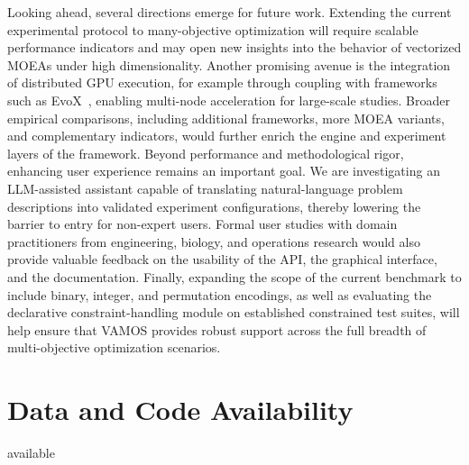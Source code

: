 \documentclass[final,5p,times,twocolumn]{elsarticle}
\newcommand{\VAMOS}{VAMOS}
\begin{document}
Looking ahead, several directions emerge for future work. Extending the current experimental protocol to many-objective optimization will require scalable performance indicators and may open new insights into the behavior of vectorized MOEAs under high dimensionality. Another promising avenue is the integration of distributed GPU execution, for example through coupling with frameworks such as EvoX~\cite{HCL+25}, enabling multi-node acceleration for large-scale studies. Broader empirical comparisons, including additional frameworks, more MOEA variants, and complementary indicators, would further enrich the engine and experiment layers of the framework. Beyond performance and methodological rigor, enhancing user experience remains an important goal. We are investigating an LLM-assisted assistant capable of translating natural-language problem descriptions into validated experiment configurations, thereby lowering the barrier to entry for non-expert users. Formal user studies with domain practitioners from engineering, biology, and operations research would also provide valuable feedback on the usability of the API, the graphical interface, and the documentation. Finally, expanding the scope of the current benchmark to include binary, integer, and permutation encodings, as well as evaluating the declarative constraint-handling module on established constrained test suites, will help ensure that \VAMOS{} provides robust support across the full breadth of multi-objective optimization scenarios.

\section*{Data and Code Availability}

 available 


\begingroup
\markrevisionreferences

\endgroup
\end{document}
